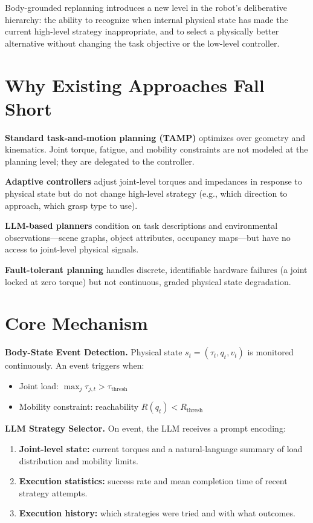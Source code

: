 \documentclass[10pt,twocolumn]{article}
\begin{document}
Body-grounded replanning introduces a new level in the robot's deliberative
hierarchy: the ability to recognize when internal physical state has made
the current high-level strategy inappropriate, and to select a physically
better alternative without changing the task objective or the low-level
controller.

\section{Why Existing Approaches Fall Short}

\textbf{Standard task-and-motion planning (TAMP)} optimizes over geometry
and kinematics. Joint torque, fatigue, and mobility constraints are not
modeled at the planning level; they are delegated to the controller.

\textbf{Adaptive controllers} adjust joint-level torques and impedances
in response to physical state but do not change high-level strategy (e.g.,
which direction to approach, which grasp type to use).

\textbf{LLM-based planners} condition on task descriptions and environmental
observations---scene graphs, object attributes, occupancy maps---but have no
access to joint-level physical signals.

\textbf{Fault-tolerant planning} handles discrete, identifiable hardware
failures (a joint locked at zero torque) but not continuous, graded physical
state degradation.

\section{Core Mechanism}

\textbf{Body-State Event Detection.} Physical state $s_t = (\tau_t, q_t,
v_t)$ is monitored continuously. An event triggers when:
\begin{itemize}[itemsep=2pt,parsep=0pt]
  \item Joint load: $\max_j \tau_{j,t} > \tau_\text{thresh}$
  \item Mobility constraint: reachability $R(q_t) < R_\text{thresh}$
\end{itemize}

\textbf{LLM Strategy Selector.} On event, the LLM receives a prompt encoding:
\begin{enumerate}[itemsep=2pt,parsep=0pt]
  \item \textbf{Joint-level state:} current torques and a natural-language
    summary of load distribution and mobility limits.
  \item \textbf{Execution statistics:} success rate and mean completion time
    of recent strategy attempts.
  \item \textbf{Execution history:} which strategies were tried and with
    what outcomes.
\end{enumerate}
\end{document}
